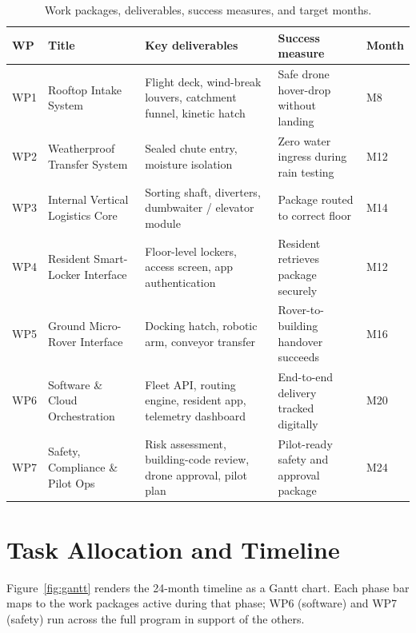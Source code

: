 \documentclass[11pt,a4paper]{report}
\begin{document}
\begin{table}[H]
\centering
\caption{Work packages, deliverables, success measures, and target months.}
\label{tab:wps}
\small
\begin{tabularx}{\linewidth}{L{0.8cm} L{3.4cm} X X L{1.0cm}}
\toprule
\textbf{WP} & \textbf{Title} & \textbf{Key deliverables} & \textbf{Success measure} & \textbf{Month} \\
\midrule
WP1 & Rooftop Intake System          & Flight deck, wind-break louvers, catchment funnel, kinetic hatch         & Safe drone hover-drop without landing                & M8  \\
WP2 & Weatherproof Transfer System   & Sealed chute entry, moisture isolation                                   & Zero water ingress during rain testing               & M12 \\
WP3 & Internal Vertical Logistics Core & Sorting shaft, diverters, dumbwaiter / elevator module                 & Package routed to correct floor                      & M14 \\
WP4 & Resident Smart-Locker Interface & Floor-level lockers, access screen, app authentication                  & Resident retrieves package securely                  & M12 \\
WP5 & Ground Micro-Rover Interface   & Docking hatch, robotic arm, conveyor transfer                            & Rover-to-building handover succeeds                  & M16 \\
WP6 & Software \& Cloud Orchestration & Fleet API, routing engine, resident app, telemetry dashboard            & End-to-end delivery tracked digitally                & M20 \\
WP7 & Safety, Compliance \& Pilot Ops & Risk assessment, building-code review, drone approval, pilot plan       & Pilot-ready safety and approval package              & M24 \\
\bottomrule
\end{tabularx}
\end{table}

\section{Task Allocation and Timeline}
\label{sec:timeline}

Figure~\ref{fig:gantt} renders the 24-month timeline as a Gantt chart.
Each phase bar maps to the work packages active during that phase;
WP6 (software) and WP7 (safety) run across the full program in support
of the others.
\end{document}
